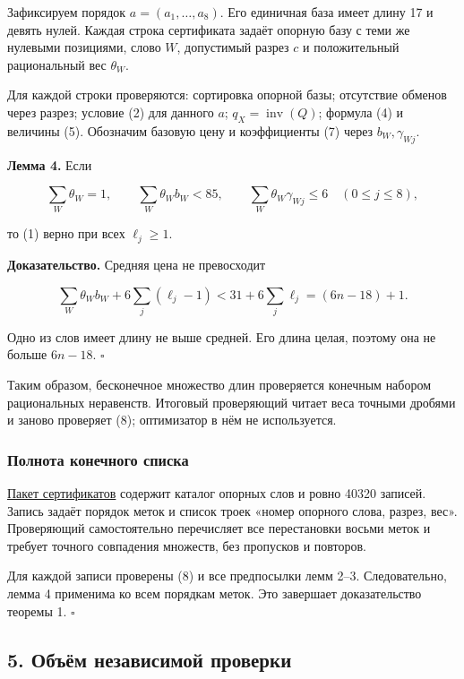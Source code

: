 \documentclass[
  11pt,
  a4paper,
]{article}
\begin{document}
Зафиксируем порядок \(a=(a_1,\ldots,a_8)\). Его единичная база имеет
длину 17 и девять нулей. Каждая строка сертификата задаёт опорную базу с
теми же нулевыми позициями, слово \(W\), допустимый разрез \(c\) и
положительный рациональный вес \(\theta_W\).

Для каждой строки проверяются: сортировка опорной базы; отсутствие
обменов через разрез; условие (2) для данного \(a\);
\(q_X=\operatorname{inv}(Q)\); формула (4) и величины (5). Обозначим
базовую цену и коэффициенты (7) через \(b_W,\gamma_{Wj}\).

\textbf{Лемма 4.} Если

\[\sum_W\theta_W=1,\qquad
\sum_W\theta_W b_W<85,\qquad
\sum_W\theta_W\gamma_{Wj}\le6\quad(0\le j\le8),\tag{8}\]

то (1) верно при всех \(\ell_j\ge1\).

\textbf{Доказательство.} Средняя цена не превосходит

\[\sum_W\theta_Wb_W+6\sum_j(\ell_j-1)
<31+6\sum_j\ell_j=(6n-18)+1.\]

Одно из слов имеет длину не выше средней. Его длина целая, поэтому она
не больше \(6n-18\). \(\square\)

Таким образом, бесконечное множество длин проверяется конечным набором
рациональных неравенств. Итоговый проверяющий читает веса точными
дробями и заново проверяет (8); оптимизатор в нём не используется.

\hypertarget{ux43fux43eux43bux43dux43eux442ux430-ux43aux43eux43dux435ux447ux43dux43eux433ux43e-ux441ux43fux438ux441ux43aux430}{%
\subsubsection{Полнота конечного
списка}\label{ux43fux43eux43bux43dux43eux442ux430-ux43aux43eux43dux435ux447ux43dux43eux433ux43e-ux441ux43fux438ux441ux43aux430}}

\href{literature/multiset_nine_gap_complete_certificates_20260924.json}{Пакет
сертификатов} содержит каталог опорных слов и ровно 40320 записей.
Запись задаёт порядок меток и список троек «номер опорного слова,
разрез, вес». Проверяющий самостоятельно перечисляет все перестановки
восьми меток и требует точного совпадения множеств, без пропусков и
повторов.

Для каждой записи проверены (8) и все предпосылки лемм 2--3.
Следовательно, лемма 4 применима ко всем порядкам меток. Это завершает
доказательство теоремы 1. \(\square\)

\hypertarget{ux43eux431ux44aux451ux43c-ux43dux435ux437ux430ux432ux438ux441ux438ux43cux43eux439-ux43fux440ux43eux432ux435ux440ux43aux438}{%
\subsection{5. Объём независимой
проверки}\label{ux43eux431ux44aux451ux43c-ux43dux435ux437ux430ux432ux438ux441ux438ux43cux43eux439-ux43fux440ux43eux432ux435ux440ux43aux438}}
\end{document}

